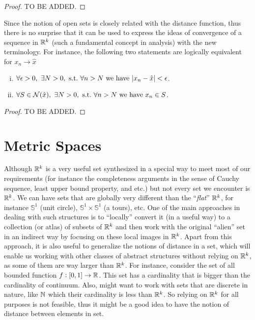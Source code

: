 \begin{proof}
	TO BE ADDED.
\end{proof}

Since the notion of open sets is closely related with the distance function, thus there is no surprise that it can be used to express the ideas of convergence of a sequence in $\mathbb{R}^k$ (such a fundamental concept in analysis) with the new terminology. For instance, the following two statements are logically equivalent for $x_n\to\hat{x}$
\begin{enumerate}[(i)]
	\item $\forall \epsilon>0,\ \exists N>0,\ \text{s.t.}\  \forall n>N \ \text{we have}\  |x_n-\hat{x}| < \epsilon$.
	\item $\forall S \in \mathcal{N}(\hat{x}),\ \exists N>0,\st \forall n > N \wh x_n \in S$.
\end{enumerate}
\begin{proof}
	TO BE ADDED.
\end{proof}

\section{Metric Spaces}
Although $\mathbb{R}^k$ is a very useful set synthesized in a special way to meet most of our requirements (for instance the completeness arguments in the sense of Cauchy sequence, least upper bound property, and etc.) but not every set we encounter is $\mathbb{R}^k$. We can have sets that are globally very different than the ``\emph{flat}'' $\mathbb{R}^k$, for instance $\mathbb{S}^1$ (unit circle), $\mathbb{S}^1 \times \mathbb{S}^1$ (a tours), etc. One of the main approaches in dealing with such structures is to ``locally'' convert it  (in a useful way) to a collection (or atlas) of subsets of $\mathbb{R}^k$ and then work with the original ``alien'' set in an indirect way by focusing on these local images in $\mathbb{R}^k$. Apart from this approach, it is also useful to generalize the notions of distance in a set, which will enable us working with other classes of abstract structures without relying on $\mathbb{R}^k$, as some of them are way larger than $\mathbb{R}^k$. For instance, consider the set of all bounded function $f:[0,1]\to\mathbb{R}$. This set has a cardinality that is bigger than the cardinality of continuum. Also, might want to work with sets that are discrete in nature, like $\mathbb{N}$ which their cardinality is less than $\mathbb{R}^k$. So relying on $\mathbb{R}^k$ for all purposes is not feasible, thus it might be a good idea to have the notion of distance between elements in set.

